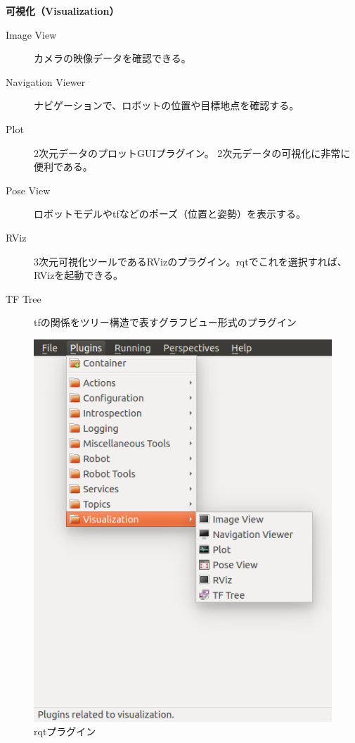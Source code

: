 \textbf{可視化（Visualization）}
\begin{description}
\item  [Image View] カメラの映像データを確認できる。
\item  [Navigation Viewer] ナビゲーションで、ロボットの位置や目標地点を確認する。
\item  [Plot] 2次元データのプロットGUIプラグイン。 2次元データの可視化に非常に便利である。
\item  [Pose View] ロボットモデルやtfなどのポーズ（位置と姿勢）を表示する。
\item  [RViz] 3次元可視化ツールであるRVizのプラグイン。rqtでこれを選択すれば、RVizを起動できる。
\item  [TF Tree] tfの関係をツリー構造で表すグラフビュー形式のプラグイン
\end{description}

\begin{figure}[htp]
  \centering
  \includegraphics[width=\columnwidth]{pictures/chapter5/pic_05_09.png}
  \caption{rqtプラグイン}
\end{figure}

